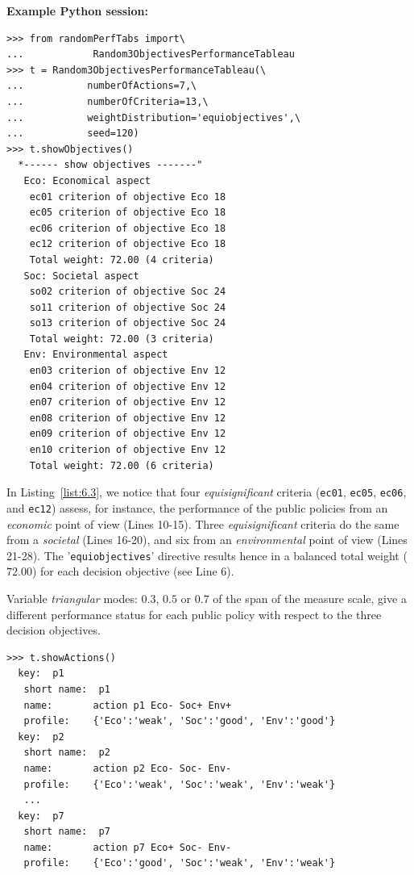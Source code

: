 \noindent \textbf{Example Python session:}
\begin{lstlisting}[caption={Generating a random 3 Objectives performance tableau},label=list:6.3]
>>> from randomPerfTabs import\
...            Random3ObjectivesPerformanceTableau
>>> t = Random3ObjectivesPerformanceTableau(\
...           numberOfActions=7,\
...           numberOfCriteria=13,\
...           weightDistribution='equiobjectives',\
...           seed=120)
>>> t.showObjectives()
  *------ show objectives -------"
   Eco: Economical aspect
    ec01 criterion of objective Eco 18
    ec05 criterion of objective Eco 18
    ec06 criterion of objective Eco 18
    ec12 criterion of objective Eco 18
    Total weight: 72.00 (4 criteria)
   Soc: Societal aspect
    so02 criterion of objective Soc 24
    so11 criterion of objective Soc 24
    so13 criterion of objective Soc 24
    Total weight: 72.00 (3 criteria)
   Env: Environmental aspect
    en03 criterion of objective Env 12
    en04 criterion of objective Env 12
    en07 criterion of objective Env 12
    en08 criterion of objective Env 12
    en09 criterion of objective Env 12
    en10 criterion of objective Env 12
    Total weight: 72.00 (6 criteria)
\end{lstlisting}

In Listing~\vref{list:6.3}, we notice that four \emph{equisignificant} criteria (\texttt{ec01}, \texttt{ec05}, \texttt{ec06}, and \texttt{ec12}) assess, for instance, the performance of the public policies from an \emph{economic} point of view (Lines 10-15). Three \emph{equisignificant} criteria do the same from a \emph{societal} (Lines 16-20), and six from an \emph{environmental} point of view (Lines 21-28). The '\texttt{equiobjectives}' directive results hence in a balanced total weight ($72.00$) for each decision objective (see Line 6). 

Variable \emph{triangular} modes: $0.3$, $0.5$ or $0.7$ of the span of the measure scale, give a different performance status for each public policy with respect to the three decision objectives.
\begin{lstlisting}
>>> t.showActions()
  key:  p1
   short name:  p1
   name:       action p1 Eco- Soc+ Env+
   profile:    {'Eco':'weak', 'Soc':'good', 'Env':'good'}
  key:  p2
   short name:  p2
   name:       action p2 Eco- Soc- Env-
   profile:    {'Eco':'weak', 'Soc':'weak', 'Env':'weak'}
   ...
  key:  p7
   short name:  p7
   name:       action p7 Eco+ Soc- Env-
   profile:    {'Eco':'good', 'Soc':'weak', 'Env':'weak'}
\end{lstlisting}

